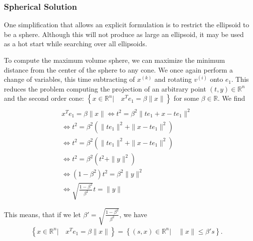 \documentclass{article}
\theoremstyle{case}
\numberwithin{theorem}{subsection}
\newcommand{\reals}{\mathbb R}
\newcommand{\Rn}{\mathbb R^n}
\newcommand{\xk}{x^{(k)}}
\begin{document}
%             
% 


\subsubsection{Spherical Solution}

One simplification that allows an explicit formulation is to restrict the ellipsoid to be a sphere.
Although this will not produce as large an ellipsoid, it may be used as a hot start while searching over all ellipsoids.

To compute the maximum volume sphere, we can maximize the minimum distance from the center of the sphere to any cone.
We once again perform a change of variables, this time subtracting of $\xk$ and rotating $v^{(i)}$ onto $e_1$.
This reduces the problem computing the projection of an arbitrary point $(t, y) \in \Rn$ and the second order cone: $\left\{ x \in \mathbb R^n | \quad x^Te_1 = \beta \|x\| \right\}$ for some $\beta \in \reals$.
We find
\begin{align*}
 \\
x^Te_1 = \beta \|x\| 
 \Longleftrightarrow t^2 = \beta^2 \|te_1  + x - t e_1\|^2 \\
 \Longleftrightarrow t^2 = \beta^2 \left(\|te_1\|^2  + \|x - t e_1\|^2\right) \\
 \Longleftrightarrow t^2 = \beta^2 \left(\|te_1\|^2  + \|x - t e_1\|^2\right) \\
 \Longleftrightarrow t^2 = \beta^2 \left(t^2  + \|y\|^2 \right) \\
 \Longleftrightarrow (1 - \beta^2)t^2 = \beta^2 \|y\|^2 \\
 \Longleftrightarrow \sqrt{\frac{1 - \beta^2}{ \beta^2}} t = \|y\|
\end{align*}

This means, that if we let $\beta' = \sqrt{\frac{1 - \beta^2}{\beta^2}}$, we have
\begin{align*}
\left\{ x \in \mathbb R^n | \quad x^Te_1 = \beta \|x\| \right\} = \left \{(s, x)\in \mathbb R^n | \quad\|x\| \le \beta' s \right\}.
\end{align*}
\end{document}
